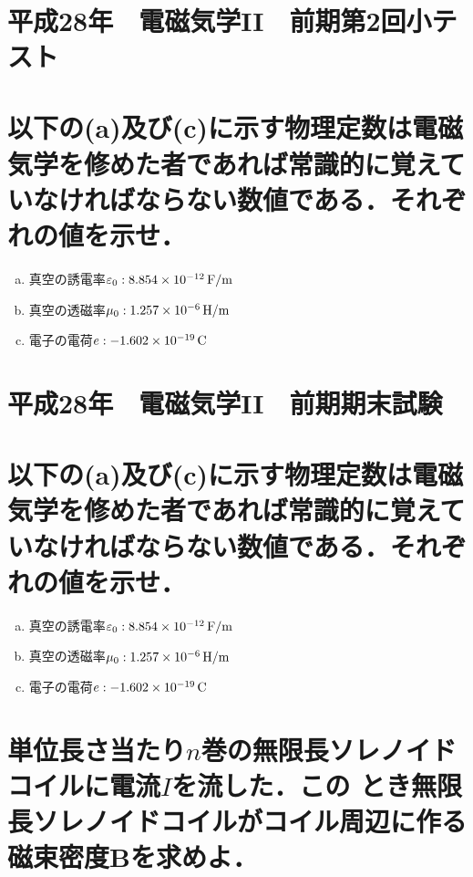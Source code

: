 \documentclass[dvipdfmx]{ujarticle}
\begin{document}
\section{}
\begin{align*}
\end{align*}

\clearpage
\setcounter{section}{0}
\section*{平成28年　電磁気学II　前期第2回小テスト}
\section{以下の(a)及び(c)に示す物理定数は電磁気学を修めた者であれば常識的に覚えていなければならない数値である．それぞれの値を示せ．}
\begin{enumerate}[(a)]
	\item 真空の誘電率$\varepsilon_{0}:8.854 \times 10^{-12}\,\rm{F/m}$
	\item 真空の透磁率$\mu_{0}:1.257 \times 10^{-6}\,\rm{H/m}$
	\item 電子の電荷$e:-1.602 \times 10^{-19}\,\rm{C}$
\end{enumerate}

\clearpage
\setcounter{section}{0}
\section*{平成28年　電磁気学II　前期期末試験}
\section{以下の(a)及び(c)に示す物理定数は電磁気学を修めた者であれば常識的に覚えていなければならない数値である．それぞれの値を示せ．}
\begin{enumerate}[(a)]
	\item 真空の誘電率$\varepsilon_{0}:8.854 \times 10^{-12}\,\rm{F/m}$
	\item 真空の透磁率$\mu_{0}:1.257 \times 10^{-6}\,\rm{H/m}$
	\item 電子の電荷$e:-1.602 \times 10^{-19}\,\rm{C}$
\end{enumerate}

\section{単位長さ当たり$n$巻の無限長ソレノイドコイルに電流$I$を流した．この
とき無限長ソレノイドコイルがコイル周辺に作る磁束密度$\boldsymbol{B}$を求めよ．}
\begin{align*}
\end{align*}
\end{document}
